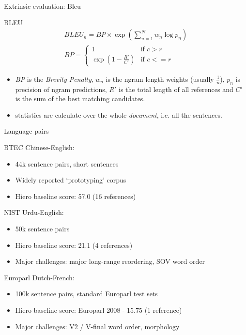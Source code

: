 \documentclass{beamer}
\newenvironment{unpacked_itemize}{
\begin{itemize}
  \setlength{\itemsep}{10pt}
  \setlength{\parskip}{0pt}
  \setlength{\parsep}{0pt}
}{\end{itemize}}
\begin{document}
\begin{frame}[t]{Extrinsic evaluation: Bleu}
\begin{exampleblock}{BLEU}
\Large
\begin{align}
\nonumber BLEU_n = BP \times \exp{\left( \sum_{n=1}^{N} w_n \log{p_n} \right) }\\
\nonumber BP = \left\{ 
  \begin{array}{ll} 
    1 & \mbox{if $c > r$}  \\
    \exp{(1-\frac{R'}{C'})} & \mbox{if $c <= r$}
  \end{array} \right.
\end{align}
\end{exampleblock}
\begin{itemize}
\item {\em BP} is the {\em Brevity Penalty}, $w_n$ is the ngram length weights (usually $\frac{1}{n}$), $p_n$ is precision of ngram predictions, $R'$ is the total length of all references and $C'$ is the sum of the best matching candidates.
\item statistics are calculate over the whole {\em document}, i.e. all the sentences.
\end{itemize}
\end{frame}



\begin{frame}[t]{Language pairs}
\begin{unpacked_itemize}
\item BTEC Chinese-English:
  \begin{itemize}
  \item 44k sentence pairs, short sentences
  \item Widely reported `prototyping' corpus
  \item Hiero baseline score: 57.0 (16 references)
  \end{itemize}
\item NIST Urdu-English:
  \begin{itemize}
  \item 50k sentence pairs
  \item Hiero baseline score: 21.1 (4 references)
  \item Major challenges: major long-range reordering, SOV word order
  \end{itemize}
\item Europarl Dutch-French:
  \begin{itemize}
  \item 100k sentence pairs, standard Europarl test sets
  \item Hiero baseline score: Europarl 2008 - 15.75 (1 reference)
  \item Major challenges: V2 / V-final word order, morphology
  \end{itemize}
\end{unpacked_itemize}
\end{frame}
\end{document}
